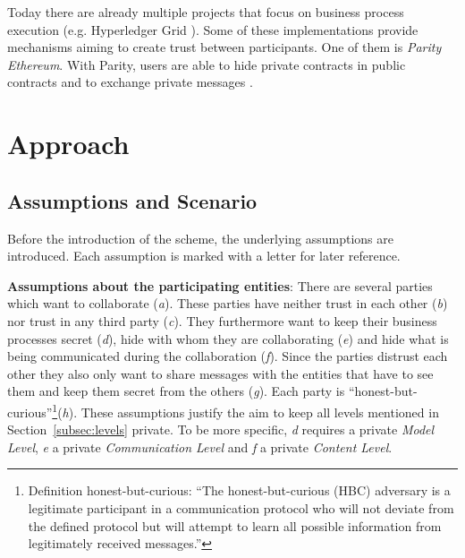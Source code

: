 \documentclass[runningheads]{llncs}
\newcommand{\comment}[1]{}
\newcommand{\ber}[1]{\textit{#1}}
\newcommand{\refsec}[1]{Section~\ref{#1}}
\renewcommand{\bigbreak}{}
\newcommand{\quotel}{``}
\newcommand{\quoter}{''}
\begin{document}
Today there are already multiple projects that focus on business process execution (e.g. Hyperledger Grid \cite{hyperledger}). Some of these implementations provide mechanisms aiming to create trust between participants. One of them is \textit{Parity Ethereum}. With Parity, users are able to hide private contracts in public contracts and to exchange private messages \cite{parity}.

\comment{However for private contract execution Parity is relying on validators,  \quotel  account[s] that can allow a private contract’s state [to] change\quoter  \cite{parity}. In our understanding this makes Parity insufficient for untrusted business execution, since, like private blockchains, it requires trust in one or multiple nodes. 
}




\section{Approach} \label{sec:approach}

\subsection{Assumptions and Scenario} \label{subsec:assumptions}

Before the introduction of the scheme, the underlying assumptions are introduced. Each assumption is marked with a letter for later reference. 


\bigbreak
\textbf{Assumptions about the participating entities}: There are several parties which want to collaborate (\ber{a}). These parties have neither trust in each other (\ber{b}) nor  trust in any third party (\ber{c}). They furthermore want to keep their business processes secret (\ber{d}),  hide with whom they are collaborating (\ber{e}) and  hide what is being communicated during the collaboration (\ber{f}). Since the parties distrust each other they also  only want to share messages with the entities that have to see them and keep them secret from the others (\ber{g}). Each party  is  \quotel  honest-but-curious\quoter  \footnote{Definition honest-but-curious:  \quotel The honest-but-curious (HBC) adversary is a legitimate participant in a communication protocol who will not deviate from the defined protocol but will attempt to learn all possible information from legitimately received messages.\quoter  \cite{paverd2014modelling}}(\ber{h}). These assumptions justify the aim to keep all levels mentioned in \refsec{subsec:levels} private. To be more specific, \ber{d} requires a private \ber{Model Level}, \ber{e} a private \ber{Communication Level} and \ber{f} a private  \ber{Content Level}.
\end{document}
